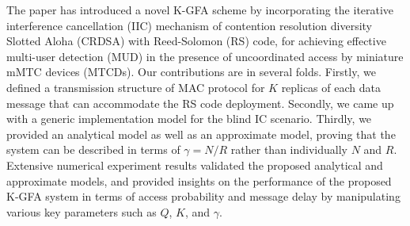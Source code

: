 \documentclass[a4paper]{IEEEtran}
\begin{document}
The paper has introduced a novel K-GFA scheme by incorporating the iterative interference cancellation (IIC) mechanism of contention resolution diversity Slotted Aloha (CRDSA) with Reed-Solomon (RS) code, for achieving effective multi-user detection (MUD) in the presence of uncoordinated access by miniature mMTC devices (MTCDs). Our contributions are in several folds. Firstly, we defined a transmission structure of MAC protocol for $K$ replicas of each data message that can accommodate the RS code deployment. Secondly, we came up with a generic implementation model for the blind IC scenario. Thirdly, we provided an analytical model as well as an approximate model, proving that the system can be described in terms of $\gamma=N/R$ rather than individually $N$ and $R$. Extensive numerical experiment results validated the proposed analytical and approximate models, and provided insights on the performance of the proposed K-GFA system in terms of access probability and message delay by manipulating various key parameters such as $Q$, $K$, and $\gamma$. 

\end{document}
